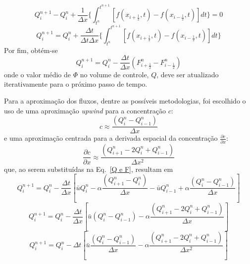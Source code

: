 \[
    Q_i^{n+1} - Q_i^n + \frac{1}{\Delta x} \Bigg\{
    \int_{t^n}^{t^{n+1}} [f(x_{i+\frac{1}{2}},t) - f(x_{i-\frac{1}{2}},t)]dt
    \Bigg\}
    = 0
\]
\[
    Q_i^{n+1} = Q_i^n + \frac{\Delta t}{\Delta t \Delta x} \Bigg\{
    \int_{t^n}^{t^{n+1}} [f(x_{i+\frac{1}{2}},t) - f(x_{i-\frac{1}{2}},t)]dt
    \Bigg\}
\]
Por fim, obtém-se
\begin{equation}\label{Q e F}
    Q_i^{n+1} = Q_i^n - \frac{\Delta t}{\Delta x}(F_{i+\frac{1}{2}}^n -
    F_{i-\frac{1}{2}}^n)
\end{equation}
onde o valor médio de $\Phi$ no volume de controle, $Q$, deve
ser atualizado iterativamente para o próximo passo de tempo.

Para a aproximação dos fluxos, dentre as possíveis metodologias, foi escolhido o
uso de uma aproximação \emph{upwind} para a concentração $c$:
\begin{equation}
    c \approx \frac{(Q_i^n - Q_{i-1}^n)}{\Delta x}
\end{equation}
e uma aproximação centrada para a derivada espacial da concentração
$\frac{\partial c}{\partial x}$:
\begin{equation}
    \frac{\partial c}{\partial x} \approx \frac{(Q_{i+1}^n - 2Q_i^n +
    Q_{i-1}^n)}{\Delta x^2}
\end{equation}
que, ao serem substituídas na Eq.\ \ref{Q e F}, resultam em
\[
     Q_i^{n+1} = Q_i^n - \frac{\Delta t}{\Delta x} \left[
     \bar{u}Q_i^n - \alpha\frac{(Q_{i+1}^n - Q_i^n)}{\Delta x}
     - \bar{u}Q_{i-1}^n + \alpha\frac{(Q_i^n - Q_{i-1}^n)}{\Delta x}
     \right]
\]
\[
    Q_i^{n+1} = Q_i^n - \frac{\Delta t}{\Delta x} \left[
    \bar{u}(Q_i^n - Q_{i-1}^n) - \alpha\frac{(Q_{i+1}^n - 2Q_i^n +
    Q_{i-1}^n)}{\Delta x}
    \right]
\]
\begin{equation}\label{eq. final}
    Q_i^{n+1} = Q_i^n - \Delta t \left[
    \bar{u}\frac{(Q_i^n - Q_{i-1}^n)}{\Delta x} - \alpha\frac{(Q_{i+1}^n -
    2Q_i^n + Q_{i-1}^n)}{\Delta x^2}
    \right]
\end{equation}